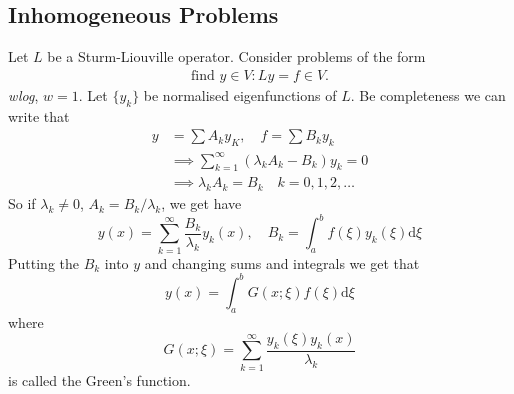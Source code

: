 \documentclass{article}
\begin{document}
\subsection{Inhomogeneous Problems}
Let $ L $ be a Sturm-Liouville operator. Consider problems of the form
\begin{align*}
	\text{find } y\in V : Ly=f\in V.
\end{align*}
\textit{wlog}, $ w=1 $. Let $ \{y_k\} $ be normalised eigenfunctions of $ L $. Be completeness we can write that
\begin{align*}
	y&=\sum A_ky_K,\quad f=\sum B_ky_k\\
	 &\implies \sum_{k=1}^\infty (\lambda_kA_k-B_k)y_k=0\\
	 &\implies \lambda_kA_k=B_k\quad k=0,1,2,\dots
\end{align*}
So if $ \lambda_k\ne 0 $, $ A_k=B_k/\lambda_k $, we get have
\[
	y(x)=\sum_{k=1}^\infty\frac{B_k}{\lambda_k}y_k(x),\quad B_k=\int_a^bf(\xi)y_k(\xi)\mathrm d\xi
\]
Putting the $ B_k $ into $ y $ and changing sums and integrals we get that
\[
	y(x)=\int_a^bG(x;\xi)f(\xi)\mathrm d\xi
\]
where
\[
	G(x;\xi)=\sum_{k=1}^\infty\frac{y_k(\xi)y_k(x)}{\lambda_k}
\]
is called the Green's function.
\end{document}
